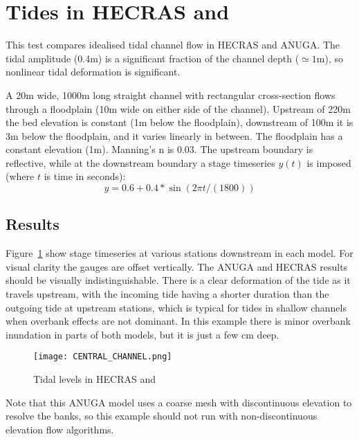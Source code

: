 \section{Tides in HECRAS and \anuga{}}
This test compares idealised tidal channel flow in HECRAS and ANUGA. The tidal
amplitude (0.4m) is a significant fraction of the channel depth ($\simeq 1$m),
so nonlinear tidal deformation is significant.  

A 20m wide, 1000m long straight channel with rectangular cross-section flows through a
floodplain (10m wide on either side of the channel). Upstream of 220m the bed
elevation is constant (1m below the floodplain), downstream of 100m it is 3m below
the floodplain, and it varies linearly in between. The floodplain has a constant
elevation (1m). Manning's n is 0.03. The upstream boundary is reflective, while
at the downstream boundary a stage timeseries $y(t)$ is imposed (where $t$ is
time in seconds):
$$y=0.6+0.4*\sin(2\pi t/(1800))$$

\subsection{Results}
Figure~\ref{result} show stage timeseries at various stations downstream in each model.
For visual clarity the gauges are offset vertically.  The ANUGA and HECRAS
results should be visually indistinguishable.  There is a clear deformation of
the tide as it travels upstream, with the incoming tide having a shorter
duration than the outgoing tide at upstream stations, which is typical for
tides in shallow channels when overbank effects are not dominant. In this
example there is minor overbank inundation in parts of both models, but it is
just a few cm deep.

\begin{figure}
\begin{center}
\texttt{[image: CENTRAL\_CHANNEL.png]}
\end{center}
\caption{Tidal levels in HECRAS and \anuga{}}
\label{result}
\end{figure}

Note that this ANUGA model uses a coarse mesh with discontinuous elevation to
resolve the banks, so this example should not run with non-discontinuous
elevation flow algorithms.

